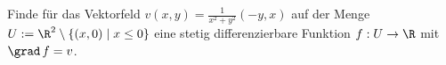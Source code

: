 \begin{prob}
Finde f\"ur das Vektorfeld $v(x,y)=\frac{1}{x^2+y^2}(-y,x)$ auf der Menge $U:=\R^2\setminus\{(x,0)\mid x\leq 0\}$ eine stetig differenzierbare Funktion $f:U\to\R$ mit $\grad\,f=v$.  
\end{prob}
